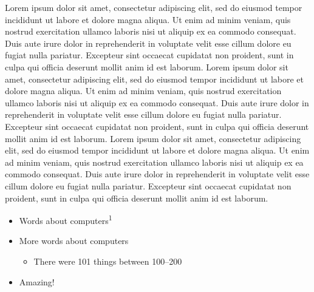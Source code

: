 \documentclass[20pt]{beamer}
\newlength{\colwidth}
\newlength{\smallcolwidth}
\begin{document}
\begin{frame}[t]
\begin{columns}[t]
\begin{column}{\smallcolwidth}
\begin{tcolorbox}[title=Background and Purpose, every float=\centering]
Lorem ipsum dolor sit amet, consectetur adipiscing elit, sed do eiusmod tempor incididunt ut labore et dolore magna aliqua. 
Ut enim ad minim veniam, quis nostrud exercitation ullamco laboris nisi ut aliquip ex ea commodo consequat. 
Duis aute irure dolor in reprehenderit in voluptate velit esse cillum dolore eu fugiat nulla pariatur. 
Excepteur sint occaecat cupidatat non proident, sunt in culpa qui officia deserunt mollit anim id est laborum. 
Lorem ipsum dolor sit amet, consectetur adipiscing elit, sed do eiusmod tempor incididunt ut labore et dolore magna aliqua. 
Ut enim ad minim veniam, quis nostrud exercitation ullamco laboris nisi ut aliquip ex ea commodo consequat. 
Duis aute irure dolor in reprehenderit in voluptate velit esse cillum dolore eu fugiat nulla pariatur. 
Excepteur sint occaecat cupidatat non proident, sunt in culpa qui officia deserunt mollit anim id est laborum. 
Lorem ipsum dolor sit amet, consectetur adipiscing elit, sed do eiusmod tempor incididunt ut labore et dolore magna aliqua. 
Ut enim ad minim veniam, quis nostrud exercitation ullamco laboris nisi ut aliquip ex ea commodo consequat. 
Duis aute irure dolor in reprehenderit in voluptate velit esse cillum dolore eu fugiat nulla pariatur. 
Excepteur sint occaecat cupidatat non proident, sunt in culpa qui officia deserunt mollit anim id est laborum.
\end{tcolorbox}

\begin{tcolorbox}[title=Methodology]

\begin{itemize}[label=\textbullet, leftmargin=*]
    \item Words about computers\textsuperscript{1} 
    \item More words about computers
    \begin{itemize}[label=\textbullet, leftmargin=*]
        \item There were \num{101} things between \numrange{100}{200}
    \end{itemize}
    \item Amazing!
\end{itemize}

\end{tcolorbox}


\end{column}
\end{columns}
\end{frame}
\end{document}
